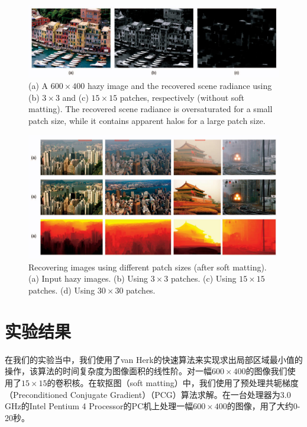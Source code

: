 \documentclass{ctexart}
\begin{document}
\begin{figure}[tbp]
	\centering
	\includegraphics[width=\textwidth]{img/10.jpg}
	\caption{(a) A $600 \times 400$ hazy image and the recovered scene radiance using (b) $3 \times 3$ and (c) $15 \times 15$ patches, respectively (without soft matting). The recovered scene radiance is oversaturated for a small patch size, while it contains apparent halos for a large patch size.}\label{fig:10}
\end{figure}

\begin{figure}[tbp]
	\centering
	\includegraphics[width=\textwidth]{img/11.jpg}
	\caption{Recovering images using different patch sizes (after soft matting). (a) Input hazy images. (b) Using $3 \times 3$ patches. (c) Using $15 \times 15$ patches. (d) Using $30 \times 30$ patches.}\label{fig:11}
\end{figure}

\section{实验结果}
在我们的实验当中，我们使用了van Herk的快速算法\cite{Herk1992}来实现求出局部区域最小值的操作，该算法的时间复杂度为图像面积的线性阶。对一幅$600 \times 400$的图像我们使用了$15 \times 15$的卷积核。在软抠图（soft matting）中，我们使用了预处理共轭梯度（Preconditioned Conjugate Gradient）（PCG）算法求解。在一台处理器为3.0 GHz的Intel Pentium 4 Processor的PC机上处理一幅$600 \times 400$的图像，用了大约0-20秒。\par
\end{document}
